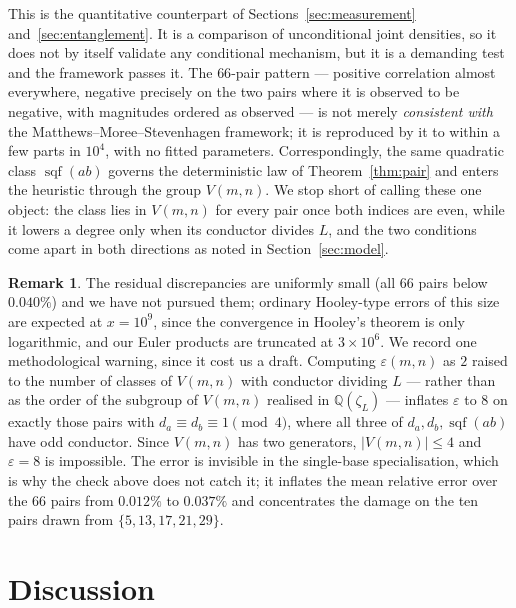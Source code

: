 \documentclass[11pt,reqno]{amsart}
\theoremstyle{plain}
\theoremstyle{definition}
\newtheorem{remark}[theorem]{Remark}
\DeclareMathOperator{\sqf}{sqf}
\newcommand{\Q}{\mathbb{Q}}
\begin{document}
This is the quantitative counterpart of Sections~\ref{sec:measurement} and~\ref{sec:entanglement}. It is a comparison of unconditional joint densities, so it does not by itself validate any conditional mechanism, but it is a demanding test and the framework passes it. The
$66$-pair pattern --- positive correlation almost everywhere, negative precisely on the two pairs where it is observed to be negative, with magnitudes ordered as observed
--- is not merely \emph{consistent with} the Matthews--Moree--Stevenhagen framework; it is
reproduced by it to within a few parts in $10^4$, with no fitted parameters.
Correspondingly, the same quadratic class $\sqf(ab)$ governs the deterministic law of Theorem~\ref{thm:pair} and enters the heuristic through the group $V(m,n)$. We stop short of calling these one object: the class lies in $V(m,n)$ for every pair once both indices are even, while it lowers a degree only when its conductor divides $L$, and the two conditions come apart in both directions as noted in Section~\ref{sec:model}.

\begin{remark}
\label{rem:eps}
The residual discrepancies are uniformly small (all $66$ pairs below
$0.040\%$) and we have not pursued them; ordinary Hooley-type errors of this
size are expected at $x = 10^9$, since the convergence in Hooley's theorem is
only logarithmic, and our Euler products are truncated at $3 \times 10^6$.
We record one methodological warning, since it cost us a draft. Computing
$\varepsilon(m,n)$ as $2$ raised to the number of classes of $V(m,n)$ with
conductor dividing $L$ --- rather than as the order of the subgroup of $V(m,n)$
realised in $\Q(\zeta_L)$ --- inflates $\varepsilon$ to $8$ on exactly those
pairs with $d_a \equiv d_b \equiv 1 \pmod 4$, where all three of
$d_a, d_b, \sqf(ab)$ have odd conductor. Since $V(m,n)$ has two generators,
$|V(m,n)| \le 4$ and $\varepsilon = 8$ is impossible. The error is invisible in
the single-base specialisation, which is why the check above does not catch it;
it inflates the mean relative error over the $66$ pairs from $0.012\%$ to
$0.037\%$ and concentrates the damage on the ten pairs drawn from
$\{5, 13, 17, 21, 29\}$.
\end{remark}

\section{Discussion}
\label{sec:discussion}
\end{document}
